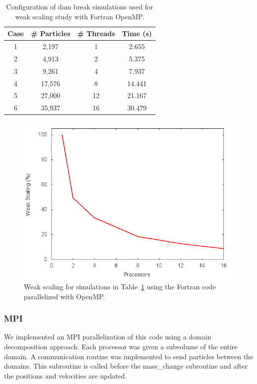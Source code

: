 \documentclass{scrartcl}
\begin{document}
      \begin{table}
      	\begin{center}
      		\begin{tabular}{| c | c | c | c |}
      			\hline
      			Case & \# Particles & \# Threads & Time (s) \\ \hline
      			1 &  2,197 &  1 & 2.655 \\ \hline		  		
      			2 &  4,913 &  2 & 5.375 \\ \hline		  		
      			3 &  9,261 &  4 & 7.937 \\ \hline		  		
      			4 &  17,576 &  8 & 14.441 \\ \hline		  		
      			5 &  27,000& 12 & 21.167 \\ \hline		  		
      			6 &  35,937 & 16 & 30.479 \\ \hline		  		
      		\end{tabular}
      		\caption{Configuration of dam break simulations used for weak scaling study with Fortran OpenMP.}
      		\label{tab:fompws}
      	\end{center}
      \end{table}
  
  
    \begin{figure}
    	\begin{center}
    		\includegraphics[width=0.6\columnwidth]{./fort_scaling/ws.png}
    		\caption{Weak scaling for simulations in Table~\ref{tab:fompws} using the Fortran code parallelized with OpenMP.}
    		\label{fig:ws_fort_omp}
    	\end{center}
    \end{figure}
  
  \subsubsection{MPI}
  We implemented an MPI parallelization of this code using a domain decomposition approach. Each processor was given a subvolume of the entire domain. A communication routine was implemented to send particles between the domains. This subroutine is called before the mass\_change subroutine and after the positions and velocities are updated. 
  
\end{document}
